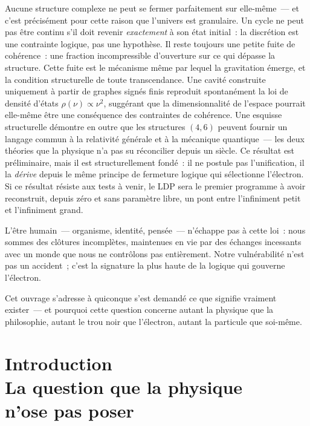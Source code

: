 \documentclass[12pt, a4paper, openright]{book}
\begin{document}
Aucune structure complexe ne peut se fermer parfaitement sur elle-même~--- et c'est précisément pour cette raison que l'univers est granulaire. Un cycle ne peut pas être continu s'il doit revenir \emph{exactement} à son état initial~: la discrétion est une contrainte logique, pas une hypothèse. Il reste toujours une petite fuite de cohérence~: une fraction incompressible d'ouverture sur ce qui dépasse la structure. Cette fuite est le mécanisme même par lequel la gravitation émerge, et la condition structurelle de toute transcendance. Une cavité construite uniquement à partir de graphes signés finis reproduit spontanément la loi de densité d'états $\rho(\nu)\propto\nu^{2}$, suggérant que la dimensionnalité de l'espace pourrait elle-même être une conséquence des contraintes de cohérence. Une esquisse structurelle démontre en outre que les structures $(4,6)$ peuvent fournir un langage commun à la relativité générale et à la mécanique quantique~--- les deux théories que la physique n'a pas su réconcilier depuis un siècle. Ce résultat est préliminaire, mais il est structurellement fondé~: il ne postule pas l'unification, il la \emph{dérive} depuis le même principe de fermeture logique qui sélectionne l'électron. Si ce résultat résiste aux tests à venir, le LDP sera le premier programme à avoir reconstruit, depuis zéro et sans paramètre libre, un pont entre l'infiniment petit et l'infiniment grand.

\medskip

L'être humain~--- organisme, identité, pensée~--- n'échappe pas à cette loi~: nous sommes des clôtures incomplètes, maintenues en vie par des échanges incessants avec un monde que nous ne contrôlons pas entièrement. Notre vulnérabilité n'est pas un accident~; c'est la signature la plus haute de la logique qui gouverne l'électron.

\medskip

Cet ouvrage s'adresse à quiconque s'est demandé ce que signifie vraiment exister~--- et pourquoi cette question concerne autant la physique que la philosophie, autant le trou noir que l'électron, autant la particule que soi-même.

\newpage

\chapter[Introduction]{Introduction \\ La question que la physique \\ n'ose pas poser}
\end{document}

